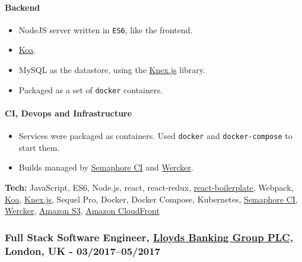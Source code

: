 \documentclass[
  a4paper,
]{article}
\providecommand{\tightlist}{%
  \setlength{\itemsep}{0pt}\setlength{\parskip}{0pt}}
\begin{document}
\hypertarget{backend}{%
\paragraph{Backend}\label{backend}}

\begin{itemize}
\tightlist
\item
  NodeJS server written in \texttt{ES6}, like the frontend.
\item
  \href{http://koajs.com}{Koa}.
\item
  MySQL as the datastore, using the \href{http://knexjs.org/}{Knex.js}
  library.
\item
  Packaged as a set of \texttt{docker} containers.
\end{itemize}

\hypertarget{ci-devops-and-infrastructure}{%
\paragraph{CI, Devops and
Infrastructure}\label{ci-devops-and-infrastructure}}

\begin{itemize}
\tightlist
\item
  Services were packaged as containers. Used \texttt{docker} and
  \texttt{docker-compose} to start them.
\item
  Builds managed by \href{https://semaphoreci.com}{Semaphore CI} and
  \href{http://www.wercker.com/}{Wercker}.
\end{itemize}

\textbf{Tech:} JavaScript, ES6, Node.js, react, react-redux,
\href{https://www.reactboilerplate.com/}{react-boilerplate}, Webpack,
\href{http://koajs.com}{Koa}, \href{http://knexjs.org/}{Knex.js}, Sequel
Pro, Docker, Docker Compose, Kubernetes,
\href{https://semaphoreci.com}{Semaphore CI},
\href{http://www.wercker.com/}{Wercker},
\href{https://aws.amazon.com/s3/}{Amazon S3},
\href{http://aws.amazon.com/cloudfront/}{Amazon CloudFront}

\hypertarget{full-stack-software-engineer-lloyds-banking-group-plc-london-uk---032017052017}{%
\subsubsection{\texorpdfstring{Full Stack Software Engineer,
\href{https://www.lloydsbankinggroup.com}{Lloyds Banking Group PLC},
London, UK -
03/2017--05/2017}{Full Stack Software Engineer, Lloyds Banking Group PLC, London, UK - 03/2017--05/2017}}\label{full-stack-software-engineer-lloyds-banking-group-plc-london-uk---032017052017}}
\end{document}
